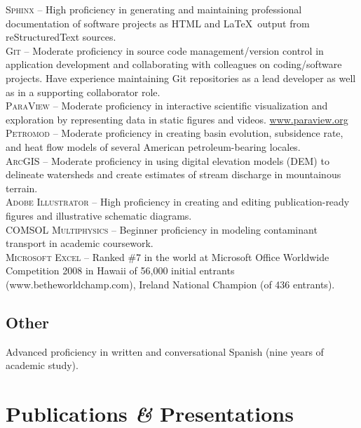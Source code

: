 \documentclass[11pt, letterpaper]{article}
\newcommand{\amper}{{\fontspec[Scale=.95]{Adobe Caslon Pro}\selectfont\itshape\&}}
\begin{document}
\textsc{Sphinx} – High proficiency in generating and maintaining professional documentation of software projects as HTML and \LaTeX \ output from reStructuredText sources.\\[5pt]
\textsc{Git} – Moderate proficiency in source code management/version control in application development and collaborating with colleagues on coding/software projects. Have experience maintaining Git repositories as a lead developer as well as in a supporting collaborator role.\\[5pt]
\textsc{ParaView} – Moderate proficiency in interactive scientific visualization and exploration by representing data in static figures and videos. \href{https://www.paraview.org/}{www.paraview.org} \\[5pt]
\textsc{Petromod} – Moderate proficiency in creating basin evolution, subsidence rate, and heat flow models of several American petroleum-bearing locales.\\[5pt] 
\textsc{ArcGIS} – Moderate proficiency in using digital elevation models (DEM) to delineate watersheds and create estimates of stream discharge in mountainous terrain.\\[5pt] 
\textsc{Adobe Illustrator} – High proficiency in creating and editing publication-ready figures and illustrative schematic diagrams.\\[5pt] 
\textsc{COMSOL Multiphysics} – Beginner proficiency in modeling contaminant transport in academic coursework.\\[5pt] 
\textsc{Microsoft Excel} – Ranked \#7 in the world at Microsoft Office Worldwide Competition 2008 in Hawaii of 56,000 initial entrants (www.betheworldchamp.com), Ireland National Champion (of 436 entrants).
\subsection*{Other}
\noindent
Advanced proficiency in written and conversational Spanish (nine years of
academic study).


\section*{Publications \amper{} Presentations}
\label{sec:pubs}  %

\end{document}
